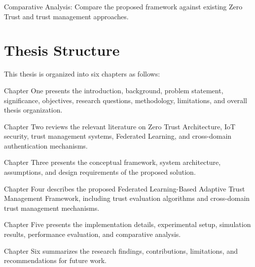 Comparative Analysis: Compare the proposed framework against existing Zero Trust and trust management approaches.


\section{Thesis Structure}

This thesis is organized into six chapters as follows:


Chapter One presents the introduction, background, problem statement, significance, objectives, research questions, methodology, limitations, and overall thesis organization.


Chapter Two reviews the relevant literature on Zero Trust Architecture, IoT security, trust management systems, Federated Learning, and cross-domain authentication mechanisms.


Chapter Three presents the conceptual framework, system architecture, assumptions, and design requirements of the proposed solution.


Chapter Four describes the proposed Federated Learning-Based Adaptive Trust Management Framework, including trust evaluation algorithms and cross-domain trust management mechanisms.


Chapter Five presents the implementation details, experimental setup, simulation results, performance evaluation, and comparative analysis.


Chapter Six summarizes the research findings, contributions, limitations, and recommendations for future work.
